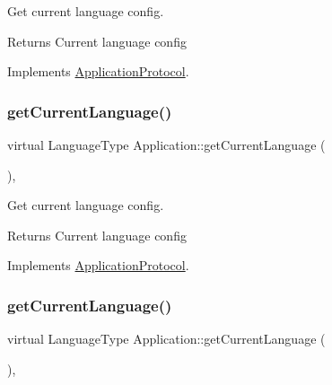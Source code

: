 Get current language config. 

\begin{DoxyReturn}{Returns}
Current language config 
\end{DoxyReturn}


Implements \hyperlink{classApplicationProtocol_a44034ed02f9dd0fc59264f74f9ef9b17}{Application\+Protocol}.

\mbox{\label{classApplication_ac972f15de44614b03604fb4e3e05cab3}} 
\subsubsection{\texorpdfstring{get\+Current\+Language()}{getCurrentLanguage()}\hspace{0.1cm}{\footnotesize\ttfamily [9/12]}}
{\footnotesize\ttfamily virtual Language\+Type Application\+::get\+Current\+Language (\begin{DoxyParamCaption}{ }\end{DoxyParamCaption})\hspace{0.3cm}{\ttfamily [override]}, {\ttfamily [virtual]}}



Get current language config. 

\begin{DoxyReturn}{Returns}
Current language config 
\end{DoxyReturn}


Implements \hyperlink{classApplicationProtocol_a44034ed02f9dd0fc59264f74f9ef9b17}{Application\+Protocol}.

\mbox{\label{classApplication_ac972f15de44614b03604fb4e3e05cab3}} 
\subsubsection{\texorpdfstring{get\+Current\+Language()}{getCurrentLanguage()}\hspace{0.1cm}{\footnotesize\ttfamily [10/12]}}
{\footnotesize\ttfamily virtual Language\+Type Application\+::get\+Current\+Language (\begin{DoxyParamCaption}{ }\end{DoxyParamCaption})\hspace{0.3cm}{\ttfamily [override]}, {\ttfamily [virtual]}}




